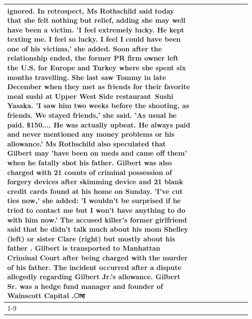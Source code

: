 \begin{table}[H]
\begin{tabular}{lllrlllll}
ignored. In retrospect, Ms Rothschild said today that she felt nothing but relief, adding she may well have been a victim. 'I feel extremely lucky. He kept texting me. I feel so lucky. I feel I could have been one of his victims,' she added. Soon after the relationship ended, the former PR firm owner left the U.S. for Europe and Turkey where she spent six months  travelling. She last saw Tommy in late December when they met as friends for their favorite meal sushi at Upper West Side restaurant Sushi Yasaka. 'I saw him two weeks before the shooting, as friends. We stayed friends,' she said. 'As usual he paid. \$150.... He was actually upbeat. He always paid and never mentioned any money problems or his allowance.' Ms Rothschild also speculated that Gilbert may 'have been on meds and came off them' when he fatally shot his father. Gilbert was also charged with 21 counts of criminal possession of forgery devices after skimming device and 21 blank credit cards found at his home on Sunday. 'I've cut ties now,' she added: 'I wouldn’t be surprised if he tried to contact me but I won’t have anything to do with him now.' The accused killer's former girlfriend said that he didn't talk much about his mom Shelley (left) or sister Clare (right) but mostly about his father . Gilbert is transported to Manhattan Criminal Court  after being charged with the murder of his father. The incident occurred after a dispute allegedly regarding Gilbert Jr.'s allowance. Gilbert Sr. was a hedge fund manager and founder of Wainscott Capital .াধ্য \\
\cline{1-9}

\end{tabular}
\end{table}
